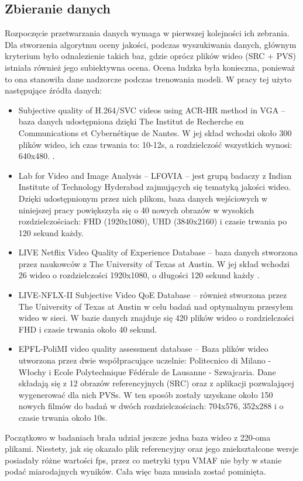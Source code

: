 \subsection{Zbieranie danych}
Rozpoczęcie przetwarzania danych wymaga w pierwszej kolejności ich zebrania. Dla stworzenia algorytmu oceny jakości, podczas wyszukiwania danych, głównym kryterium było odnalezienie takich baz, gdzie oprócz plików wideo (SRC + PVS) istniała również jego subiektywna ocena. Ocena ludzka była konieczna, ponieważ to ona stanowiła dane nadzorcze podczas trenowania modeli. W pracy tej użyto następujące źródła danych:
\begin{itemize}
\item Subjective quality of H.264/SVC videos using ACR-HR method in VGA -- baza danych udostępniona dzięki The Institut de Recherche en Communications et Cybernétique de Nantes. W jej skład wchodzi około 300 plików wideo, ich czas trwania to: 10-12s, a rozdzielczość wszystkich wynosi: 640x480. \cite{pitrey:hal-00608310}.
\item Lab for Video and Image Analysis – LFOVIA -- jest grupą badaczy z Indian Institute of Technology Hyderabad zajmujących się tematyką jakości wideo. Dzięki udostępnionym przez nich plikom,  baza danych wejściowych w niniejszej pracy powiększyła się o 40 nowych obrazów w wysokich rozdzielczościach: FHD (1920x1080), UHD (3840x2160) i czasie trwania po 120 sekund każdy\cite{india}.
\item LIVE Netflix Video Quality of Experience Database -- baza danych stworzona przez naukowców z The University of Texas at Austin. W jej skład wchodzi 26 wideo o rozdzielczości 1920x1080, o długości 120 sekund każdy \cite{netflix_1}\cite{netflix_11}.
\item LIVE-NFLX-II Subjective Video QoE Database -- również stworzona przez The University of Texas at Austin w celu badań nad optymalnym przesyłem wideo w sieci. W bazie danych znajduje się 420 plików wideo o rozdzielczości FHD i czasie trwania około 40 sekund.
\item EPFL-PoliMI video quality assessment database -- Baza plików wideo utworzona przez dwie współpracujące uczelnie: Politecnico di Milano - Włochy i Ecole Polytechnique Fédérale de Lausanne - Szwajcaria. Dane składają się z 12 obrazów referencyjnych (SRC) oraz z aplikacji pozwalającej wygenerować dla nich PVSs. W ten sposób zostały uzyskane około 150 nowych filmów do badań w dwóch rozdzielczościach: 704x576, 352x288 i o czasie trwania około 10s\cite{italy}\cite{italy_2}\cite{italy_3}.
\end{itemize}
Początkowo w badaniach brała udział jeszcze jedna baza wideo z 220-oma plikami. Niestety, jak się okazało plik referencyjny oraz jego zniekształcone wersje posiadały różne wartości fps, przez co metryki typu VMAF nie były w stanie podać miarodajnych wyników. Cała więc baza musiała zostać pominięta.\par

